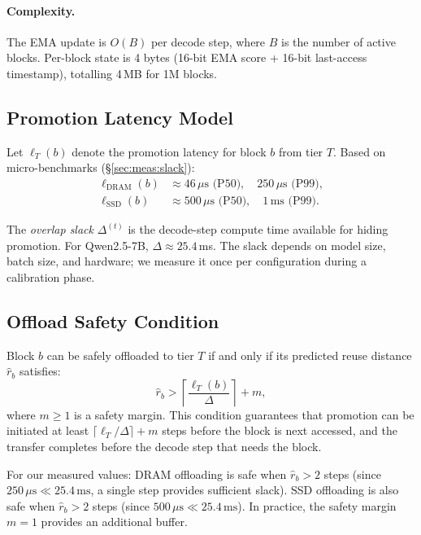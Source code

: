 \documentclass[acmsmall,nonacm,screen]{acmart}
\begin{document}
\paragraph{Complexity.}
The EMA update is $O(B)$ per decode step, where $B$ is the number of active
blocks.  Per-block state is 4 bytes (16-bit EMA score + 16-bit last-access
timestamp), totalling 4\,MB for 1M blocks.

\subsection{Promotion Latency Model}\label{sec:model:latency}

Let $\ell_T(b)$ denote the promotion latency for block $b$ from tier $T$.
Based on micro-benchmarks (\S\ref{sec:meas:slack}):
\begin{align}
  \ell_\text{DRAM}(b) &\approx 46\,\mu\text{s (P50)}, \quad 250\,\mu\text{s (P99)}, \\
  \ell_\text{SSD}(b)  &\approx 500\,\mu\text{s (P50)}, \quad 1\,\text{ms (P99)}.
\end{align}

The \emph{overlap slack} $\Delta^{(t)}$ is the decode-step compute time
available for hiding promotion.  For Qwen2.5-7B, $\Delta \approx 25.4$\,ms.
The slack depends on model size, batch size, and hardware; we measure it
once per configuration during a calibration phase.

\subsection{Offload Safety Condition}\label{sec:model:offload}

Block $b$ can be safely offloaded to tier $T$ if and only if its predicted
reuse distance $\hat{r}_b$ satisfies:
\begin{equation}\label{eq:offload}
  \hat{r}_b > \left\lceil \frac{\ell_T(b)}{\Delta} \right\rceil + m,
\end{equation}
where $m \geq 1$ is a safety margin.  This condition guarantees that
promotion can be initiated at least $\lceil \ell_T / \Delta \rceil + m$
steps before the block is next accessed, and the transfer completes before
the decode step that needs the block.

For our measured values: DRAM offloading is safe when $\hat{r}_b > 2$ steps
(since $250\,\mu\text{s} \ll 25.4\,\text{ms}$, a single step provides
sufficient slack).  SSD offloading is also safe when $\hat{r}_b > 2$ steps
(since $500\,\mu\text{s} \ll 25.4\,\text{ms}$).  In practice, the safety
margin $m=1$ provides an additional buffer.
\end{document}

